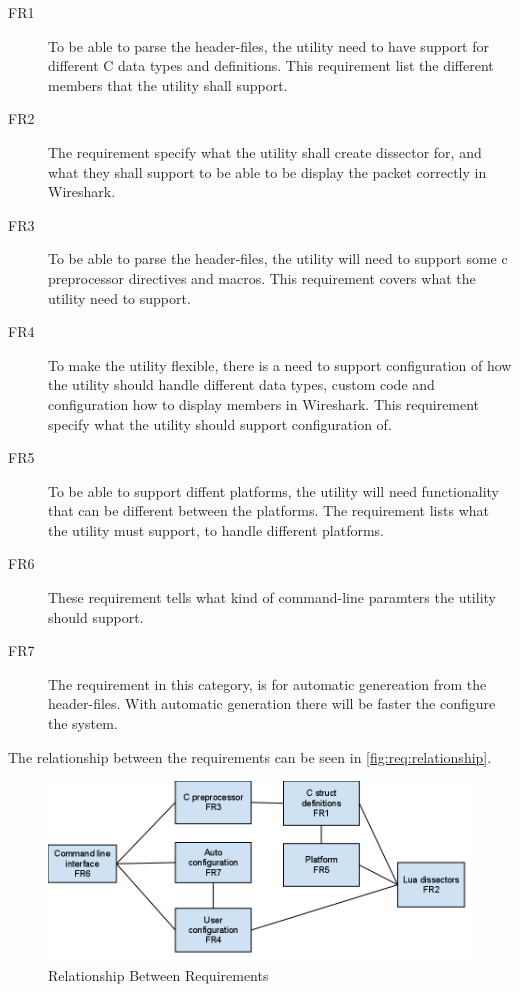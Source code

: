 \begin{description}
	\item[FR1] To be able to parse the header-files, the utility need to have
		 support for different C data types and definitions. This requirement list 
		the different members that the utility shall support.
	\item[FR2] The requirement specify what the utility shall create dissector 
		for, and what they shall support to be able to be display the packet 
		correctly in Wireshark. 
	\item[FR3] To be able to parse the header-files, the utility will need to 
		support some c preprocessor directives and macros. This requirement covers 
		what the utility need to support.
	\item[FR4] To make the utility flexible, there is a need to support 
		configuration of how the utility should handle different data types, custom 
		code and configuration how to display members in Wireshark. This requirement 
		specify what the utility should support configuration of.
	\item[FR5] To be able to support diffent platforms, the utility will need 
		functionality that can be different between the platforms. The requirement 
		lists what the utility must support, to handle different platforms.
	\item[FR6] These requirement tells what kind of command-line paramters the 
		utility should support. 
	\item[FR7] The requirement in this category, is for automatic genereation 
		from the header-files. With automatic generation there will be faster the 
		configure the system.
\end{description}

The relationship between the requirements can be seen in \autoref{fig:req:relationship}.

\begin{figure}[htbp]
	\center
	\includegraphics[width=\textwidth]{./planning/img/requirement_relationship}
	\caption{Relationship Between Requirements \label{fig:req:relationship}}
\end{figure}


